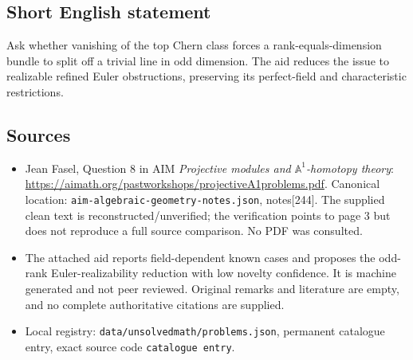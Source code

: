 \documentclass[11pt]{article}
\newcommand{\A}{\mathbb{A}}
\begin{document}
\subsection{Short English statement}
Ask whether vanishing of the top Chern class forces a rank-equals-dimension bundle to split off a trivial line in odd dimension. The aid reduces the issue to realizable refined Euler obstructions, preserving its perfect-field and characteristic restrictions.
\subsection{Sources}
\begin{itemize}
\item Jean Fasel, Question 8 in AIM \emph{Projective modules and $\A^1$-homotopy theory}: \url{https://aimath.org/pastworkshops/projectiveA1problems.pdf}. Canonical location: \texttt{aim-algebraic-geometry-notes.json}, notes[244]. The supplied clean text is reconstructed/unverified; the verification points to page 3 but does not reproduce a full source comparison. No PDF was consulted.
\item The attached aid reports field-dependent known cases and proposes the odd-rank Euler-realizability reduction with low novelty confidence. It is machine generated and not peer reviewed. Original remarks and literature are empty, and no complete authoritative citations are supplied.
\item Local registry: \texttt{data/unsolvedmath/problems.json}, permanent catalogue entry, exact source code \texttt{catalogue entry}.
\end{itemize}
\end{document}
